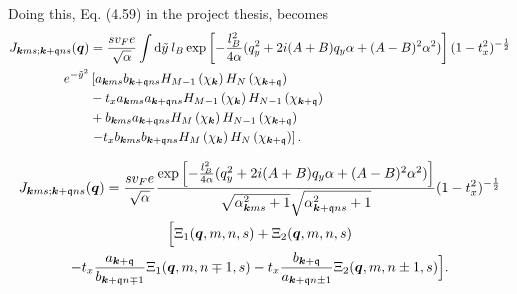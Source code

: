 Doing this, Eq. (4.59)  in the project thesis, becomes
\begin{equation}
  \label{eq:28}
  \begin{split}
    J_{\bm{k}ms; \bm{k}+\mathfrak{q} ns}(\bm{q}) &=
    \frac{s v_F e}{\sqrt{\alpha }} \int \mathrm{d}\tilde{y} \: l_B
    \exp \left[
      -\frac{l_{B}^2}{4 \alpha } (q_{y}^2 + 2i (A+B) q_{y} \alpha + (A-B)^2 \alpha^2)
    \right]
    (1-t_{x}^2)^{-\frac{1}{2}}\\
    e^{-\tilde{y}^2}
   &\left[
    a_{\bm{k}ms}b_{\bm{k} + \mathfrak{q} ns}
    H_{M-1} \left(  \chi_{\bm{k}} \right)
    H_N\left( \chi_{\bm{k} + \mathfrak{q}} \right) \right.\\
    &- t_{x} a_{\bm{k}ms}a_{\bm{k} + \mathfrak{q} ns}
    H_{M-1} \left( \chi_{\bm{k}} \right)
    H_{N-1}\left( \chi_{\bm{k} + \mathfrak{q}} \right)\\
   & +
    b_{\bm{k}ms} a_{\bm{k} + \mathfrak{q} ns}
    H_M \left( \chi_{\bm{k}} \right)
    H_{N-1} \left( \chi_{\bm{k} + \mathfrak{q}} \right)\\
    &\left. - t_{x}
    b_{\bm{k}ms} b_{\bm{k} + \mathfrak{q} ns}
    H_M \left( \chi_{\bm{k}} \right)
    H_{N} \left(  \chi_{\bm{k} + \mathfrak{q}}\right)
    \right].
  \end{split}
\end{equation}

\begin{multline}
  J_{\bm{k} m s; \bm{k} + \mathfrak{q} n s} (\bm{q}) =
  \frac{s v_{F} e}{\sqrt{\alpha }}
  \frac{
    \exp \left[
      -\frac{l_{B}^2}{4 \alpha } (q_{y}^2 + 2i (A+B) q_{y} \alpha + (A-B)^2 \alpha^2)
    \right]
  }{
    \sqrt{\alpha _{\bm{k} m s}^2 + 1} \sqrt{ \alpha _{\bm{k} + \mathfrak{q} n s}^2 + 1 }
  } (1-t_{x}^2)^{-\frac{1}{2}}\\
  \Big[
    \Xi_{1} (\bm{q}, m, n, s)
    + \Xi _{2} (\bm{q}, m, n, s)\\
    - t_x \frac{a_{\bm{k} + \mathfrak{q} }}{b_{\bm{k} + \mathfrak{q} n \mp 1}} \Xi _1(\bm{q}, m, n\mp 1, s)
    - t_x \frac{b_{\bm{k} + \mathfrak{q} }}{a_{\bm{k} + \mathfrak{q} n \pm 1}} \Xi _2(\bm{q}, m, n\pm 1, s)
  \Big].
\end{multline}

